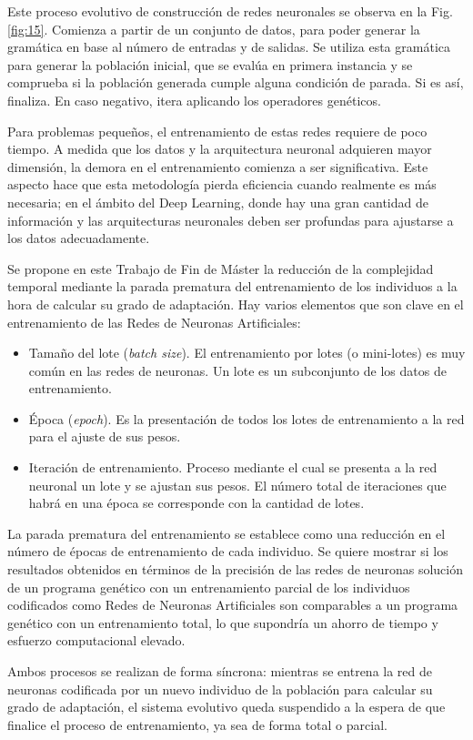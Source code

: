 \documentclass[spanish,a4paper,12pt,twoside]{report}
\begin{document}
  Este proceso evolutivo de construcción de redes neuronales se observa en la Fig. \ref{fig:15}. Comienza a partir de un conjunto de datos, para poder generar la gramática en base al número de entradas y de salidas. Se utiliza esta gramática para generar la población inicial, que se evalúa en primera instancia y se comprueba si la población generada cumple alguna condición de parada. Si es así, finaliza. En caso negativo, itera aplicando los operadores genéticos. \par
  Para problemas pequeños, el entrenamiento de estas redes requiere de poco tiempo. A medida que los datos y la arquitectura neuronal adquieren mayor dimensión, la demora en el entrenamiento comienza a ser significativa. Este aspecto hace que esta metodología pierda eficiencia cuando realmente es más necesaria; en el ámbito del Deep Learning, donde hay una gran cantidad de información y las arquitecturas neuronales deben ser profundas para ajustarse a los datos adecuadamente. \par
  Se propone en este Trabajo de Fin de Máster la reducción de la complejidad temporal mediante la parada prematura del entrenamiento de los individuos a la hora de calcular su grado de adaptación. Hay varios elementos que son clave en el entrenamiento de las Redes de Neuronas Artificiales: \par
  \begin{itemize}
    \item Tamaño del lote (\emph{batch size}). El entrenamiento por lotes (o mini-lotes) es muy común en las redes de neuronas. Un lote es un subconjunto de los datos de entrenamiento.
    \item Época (\emph{epoch}). Es la presentación de todos los lotes de entrenamiento a la red para el ajuste de sus pesos.
    \item Iteración de entrenamiento. Proceso mediante el cual se presenta a la red neuronal un lote y se ajustan sus pesos. El número total de iteraciones que habrá en una época se corresponde con la cantidad de lotes.
  \end{itemize} \par
  La parada prematura del entrenamiento se establece como una reducción en el número de épocas de entrenamiento de cada individuo. Se quiere mostrar si los resultados obtenidos en términos de la precisión de las redes de neuronas solución de un programa genético con un entrenamiento parcial de los individuos codificados como Redes de Neuronas Artificiales son comparables a un programa genético con un entrenamiento total, lo que supondría un ahorro de tiempo y esfuerzo computacional elevado. \par
  Ambos procesos se realizan de forma síncrona: mientras se entrena la red de neuronas codificada por un nuevo individuo de la población para calcular su grado de adaptación, el sistema evolutivo queda suspendido a la espera de que finalice el proceso de entrenamiento, ya sea de forma total o parcial.
    
\end{document}
